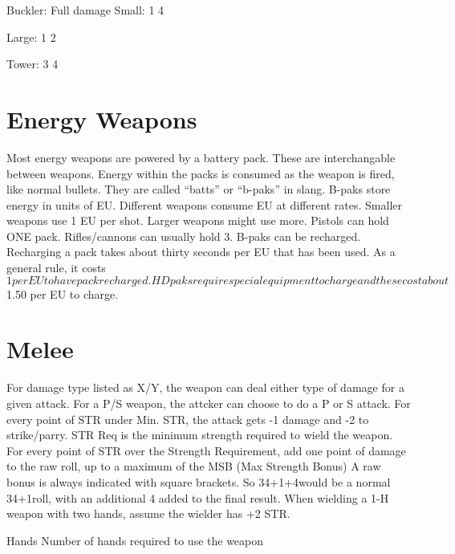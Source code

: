 \documentclass[twoside]{book}
\begin{document}
                    Buckler: Full damage   
                    Small:  1  4
                   
                    
                    Large:  1  2
                   
                    
                    Tower:  3  4
                   
                    
                  
                
            
\section{Energy Weapons}
      Most energy weapons are powered by a battery pack.
             These are interchangable between weapons. Energy within the
             packs is consumed as the weapon is fired, like normal
             bullets. They are called “batts” or
             “b-paks” in slang. B-paks store energy in units
             of EU. Different weapons consume EU at different rates.
             Smaller weapons use 1 EU per shot. Larger weapons might use
             more. Pistols can hold ONE pack. Rifles/cannons can usually
             hold 3. B-paks can be recharged. Recharging a pack takes
             about thirty seconds per EU that has been used. As a general
             rule, it costs $1 per EU to have pack recharged. HD paks
             require special equipment to charge and these cost about
             $1.50 per EU to charge. 
\section{Melee}
      For damage type listed as X/Y, the weapon can deal
             either type of damage for a given attack. For a P/S weapon,
             the attcker can choose to do a P or S attack. For every
             point of STR under Min. STR, the attack gets -1 damage and
             -2 to strike/parry. STR Req is the minimum strength required
             to wield the weapon. For every point of STR over the
             Strength Requirement, add one point of damage to the raw
             roll, up to a maximum of the MSB (Max Strength Bonus) A raw
             bonus is always indicated with square brackets. So 34+1+4would be a normal 34+1roll, with an additional 4
             added to the final result. When wielding a 1-H weapon with
             two hands, assume the wielder has +2 STR.   
            
                Hands   Number of hands
                required to use the weapon
              
\end{document}
